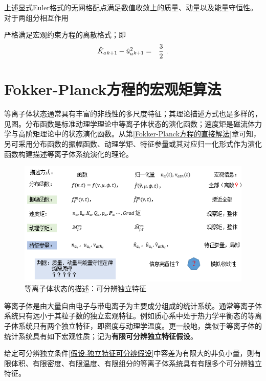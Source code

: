   上述显式Euler格式的无网格配点满足数值收敛上的质量、动量以及能量守恒性。对于两组分相互作用
  
  严格满足宏观约束方程的离散格式；即
  \begin{eqnarray}
      {\hat{K}_a}{_{k+1}} - {\hat{u}_a^2}{_{k+1}}  &=&  \frac{3}{2} ~. \label{Khauhak1}
  \end{eqnarray}




\chapter{Fokker-Planck方程的宏观矩算法}
\label{Fokker-Planck方程的宏观矩算法}

  等离子体状态通常具有丰富的非线性的多尺度特征；其理论描述方式也是多样的，见图。分布函数是标准动理学理论中等离子体状态的演化函数；速度矩是磁流体力学与高阶矩理论中的状态演化函数。从第\ref{Fokker-Planck方程的直接解法}章可知，另可采用分布函数的振幅函数、动理学矩、特征参量或其对应归一化形式作为演化函数构建描述等离子体系统演化的理论。
  \begin{figure}[htp]
	\begin{center}
		\includegraphics[width=0.8\linewidth]{figures/models/等离子体状态描述}
	\end{center}
	\caption{等离子体状态的描述：可分辨独立特征}
	\label{FigPSDisc}
  \end{figure}
  
  等离子体是由大量自由电子与带电离子为主要成分组成的统计系统。通常等离子体系统只有远小于其粒子数的独立宏观特征。例如质心系中处于热力学平衡态的等离子体系统只有两个独立特征，即密度与动理学温度。更一般地，类似于等离子体的统计系统具有如下宏观性质；记为\textbf{有限可分辨独立特征假设}。
  
  \begin{assumption} \label{假设-有限可分辨独立特征假设}
      给定可分辨独立条件\ref{假设-独立特征可分辨假设}中容差为有限大的非负小量，则有限体积、有限密度、有限温度、有限组分的等离子体系统具有有限多个可分辨独立特征。
  \end{assumption}
  
